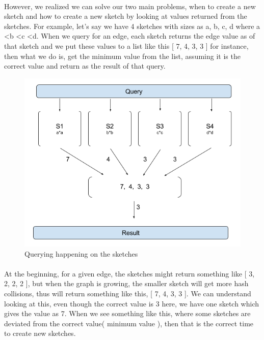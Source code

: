 \documentclass[12pt]{report}
\numberwithin{figure}{section}
\numberwithin{table}{section}
\begin{document}
\paragraph{}

However, we realized we can solve our two main problems, when to create a new sketch and how to create a new sketch by looking at values returned from the sketches. For example, let's say we have 4 sketches with sizes as a, b, c, d where a \textless  b \textless c \textless d. When we query for an edge, each sketch returns the edge value as of that sketch and  we put these values to a list like this [ 7, 4, 3, 3 ] for instance, then what we do is, get the minimum value from the list, assuming it is the correct value and return as the result of that query.

\begin{figure}[H]
\centering
\includegraphics[scale=0.7]{images/QueryOnSketches}
\caption{Querying happening on the sketches}
\end{figure}

\paragraph{}

At the beginning, for a given edge, the sketches might return something like [ 3, 2, 2, 2 ], but when the graph is growing, the smaller sketch will get more hash collisions, thus will return something like this, [ 7, 4, 3, 3  ]. We can understand looking at this, even though the correct value is 3 here, we have one sketch which gives the value as 7. When we see something like this, where some sketches are deviated from the correct value( minimum value ), then that is the correct time to create new sketches. 
\end{document}

